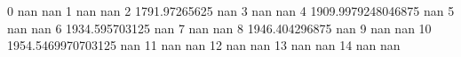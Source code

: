 0 nan nan
1 nan nan
2 1791.97265625 nan
3 nan nan
4 1909.9979248046875 nan
5 nan nan
6 1934.595703125 nan
7 nan nan
8 1946.404296875 nan
9 nan nan
10 1954.5469970703125 nan
11 nan nan
12 nan nan
13 nan nan
14 nan nan
